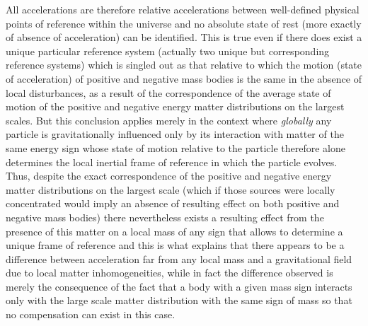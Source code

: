 \documentclass[notitlepage,12pt]{report}
\begin{document}
All accelerations are therefore relative accelerations between well-defined physical points of reference within the universe and no absolute state of rest (more exactly of absence of acceleration) can be identified. This is true even if there does exist a unique particular reference system (actually two unique but corresponding reference systems) which is singled out as that relative to which the motion (state of acceleration) of positive and negative mass bodies is the same in the absence of local disturbances, as a result of the correspondence of the average state of motion of the positive and negative energy matter distributions on the largest scales. But this conclusion applies merely in the context where \textit{globally} any particle is gravitationally influenced only by its interaction with matter of the same energy sign whose state of motion relative to the particle therefore alone determines the local inertial frame of reference in which the particle evolves. Thus, despite the exact correspondence of the positive and negative energy matter distributions on the largest scale (which if those sources were locally concentrated would imply an absence of resulting effect on both positive and negative mass bodies) there nevertheless exists a resulting effect from the presence of this matter on a local mass of any sign that allows to determine a unique frame of reference and this is what explains that there appears to be a difference between acceleration far from any local mass and a gravitational field due to local matter inhomogeneities, while in fact the difference observed is merely the consequence of the fact that a body with a given mass sign interacts only with the large scale matter distribution with the same sign of mass so that no compensation can exist in this case.
\end{document}
